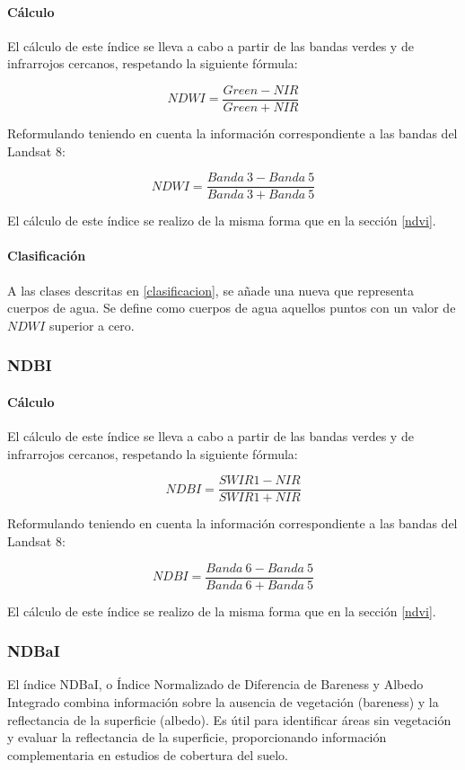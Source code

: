 \paragraph{Cálculo}

El cálculo de este índice se lleva a cabo a partir de las bandas verdes y de infrarrojos cercanos, respetando la siguiente fórmula:

$$NDWI = \frac{Green - NIR}{Green + NIR}$$

Reformulando teniendo en cuenta la información correspondiente a las bandas del Landsat 8:

$$NDWI = \frac{Banda~3-Banda~5}{Banda~3+Banda~5}$$

El cálculo de este índice se realizo de la misma forma que en la sección \ref{ndvi}.


\paragraph{Clasificación} 

A las clases descritas en \ref{clasificacion}, se añade una nueva que representa cuerpos de agua. Se define como cuerpos de agua aquellos puntos con un valor de $NDWI$ superior a cero.

\subsubsection{NDBI}

\paragraph{Cálculo}

El cálculo de este índice se lleva a cabo a partir de las bandas verdes y de infrarrojos cercanos, respetando la siguiente fórmula:

$$NDBI = \frac{SWIR1 - NIR}{SWIR1 + NIR}$$

Reformulando teniendo en cuenta la información correspondiente a las bandas del Landsat 8:

$$NDBI = \frac{Banda~6-Banda~5}{Banda~6+Banda~5}$$

El cálculo de este índice se realizo de la misma forma que en la sección \ref{ndvi}.

\subsubsection{NDBaI}

El índice NDBaI, o Índice Normalizado de Diferencia de Bareness y Albedo Integrado combina información sobre la ausencia de vegetación (bareness) y la reflectancia de la superficie (albedo). Es útil para identificar áreas sin vegetación y evaluar la reflectancia de la superficie, proporcionando información complementaria en estudios de cobertura del suelo.

